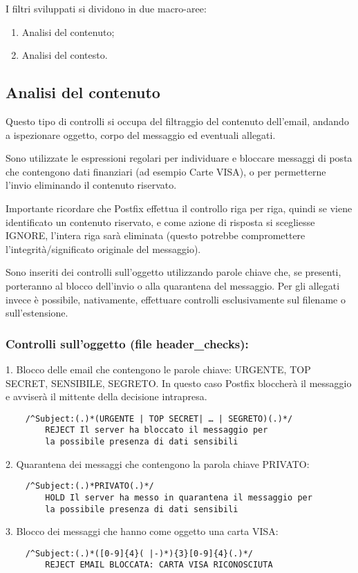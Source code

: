     I filtri sviluppati si dividono in due macro-aree:

    \begin{enumerate}
        \item Analisi del contenuto;
        \item Analisi del contesto.
    \end{enumerate}

    \subsection{Analisi del contenuto}
    Questo tipo di controlli si occupa del filtraggio del contenuto dell'email, 
    andando a ispezionare oggetto, corpo del messaggio ed eventuali allegati. 
    
    Sono utilizzate le espressioni regolari per individuare e bloccare messaggi di posta che contengono dati
    finanziari (ad esempio Carte VISA), o per permetterne l’invio eliminando il contenuto riservato. 
    
    Importante ricordare che Postfix effettua il controllo riga per riga, quindi se viene identificato un 
    contenuto riservato, e come azione di risposta si scegliesse IGNORE, 
    l’intera riga sarà eliminata (questo potrebbe compromettere l’integrità/significato originale del messaggio). 
    
    Sono inseriti dei controlli sull’oggetto utilizzando parole chiave che, se presenti, 
    porteranno al blocco dell’invio o alla quarantena del messaggio. Per gli allegati invece è possibile, nativamente,
    effettuare controlli esclusivamente sul filename o sull’estensione. 

    \subsubsection{Controlli sull'oggetto (file header\_checks):}

    1. Blocco delle email che contengono le parole chiave: URGENTE, TOP SECRET, SENSIBILE, SEGRETO.
    In questo caso Postfix bloccherà il messaggio e avviserà il mittente della decisione intrapresa.

    \begin{verbatim}
    /^Subject:(.)*(URGENTE | TOP SECRET| … | SEGRETO)(.)*/
        REJECT Il server ha bloccato il messaggio per 
        la possibile presenza di dati sensibili
    \end{verbatim}
    2. Quarantena dei messaggi che contengono la parola chiave PRIVATO:
    \begin{verbatim}
    /^Subject:(.)*PRIVATO(.)*/
        HOLD Il server ha messo in quarantena il messaggio per 
        la possibile presenza di dati sensibili
    \end{verbatim}
    3. Blocco dei messaggi che hanno come oggetto una carta VISA:
    \begin{verbatim}
    /^Subject:(.)*([0-9]{4}( |-)*){3}[0-9]{4}(.)*/
        REJECT EMAIL BLOCCATA: CARTA VISA RICONOSCIUTA
    \end{verbatim}


